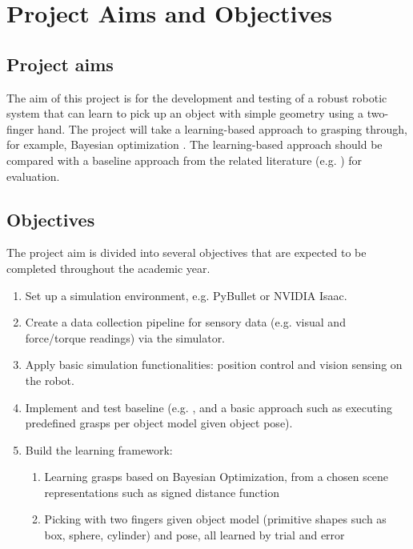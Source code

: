 \documentclass[11pt, a4paper]{report}
\theoremstyle{definition}
\begin{document}
\section{Project Aims and Objectives}
\label{sec:1.2}

\subsection{Project aims}
\label{sec:1.2.1}
The aim of this project is for the development and testing of a robust robotic system that can learn to pick up an object with simple geometry using a two-finger hand. The project will take a learning-based approach to grasping through, for example, Bayesian optimization \cite{nogueria, frazier}. The learning-based approach should be compared with a baseline approach from the related literature (e.g. \cite{nogueria, danielczuk, breyer}) for evaluation. 

\subsection{Objectives}
\label{sec:1.2.2}
The project aim is divided into several objectives that are expected to be completed throughout the academic year. 
\begin{enumerate}
    \item Set up a simulation environment, e.g. PyBullet or NVIDIA Isaac. 
    \item Create a data collection pipeline for sensory data (e.g. visual and force/torque readings) via the simulator.
    \item Apply basic simulation functionalities: position control and vision sensing on the robot.
    \item Implement and test baseline (e.g. \cite{breyer}, and a basic approach such as executing predefined grasps per object model given object pose).
    \item Build the learning framework:
    \begin{enumerate}
        \item Learning grasps based on Bayesian Optimization, from a chosen scene representations such as signed distance function 
        \item Picking with two fingers given object model (primitive shapes such as box, sphere, cylinder) and pose, all learned by trial and error
    \end{enumerate}
\end{enumerate}
\end{document}
